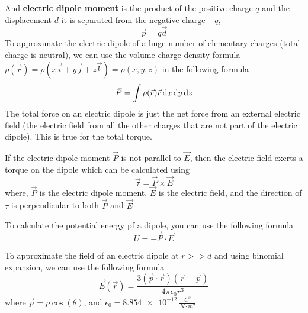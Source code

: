 And \textbf{electric dipole moment} is the product of the positive charge $q$ and the displacement $d$ it is separated from the negative charge $-q$,
\begin{equation}
\vec{p} = q\vec{d}
\end{equation}
To approximate the electric dipole of a huge number of elementary charges (total charge is neutral), we can use the volume charge density formula $\rho(\vec{r}) = \rho(x\vec{i} + y\vec{j} + z\vec{k}) = \rho(x, y, z) $ in the following formula
\begin{equation}
\vec{P} = \int\rho(\vec{r})\vec{r}\operatorname{d\!} x \operatorname{d\!} y \operatorname{d\!} z
\end{equation}
The total force on an electric dipole is just the net force from an external electric field (the electric field from all the other charges that are not part of the electric dipole). This is true for the total torque.

If the electric dipole moment $\vec{P}$ is not parallel to $\vec{E}$, then the electric field exerts a torque on the dipole which can be calculated using
\begin{equation}
\vec{\tau} = \vec{P} \times \vec{E}
\end{equation}
where, $\vec{P}$ is the electric dipole moment, $\vec{E}$ is the electric field, and the direction of $\tau$ is perpendicular to both $\vec{P}$ and $\vec{E}$

To calculate the potential energy pf a dipole, you can use the following formula
\begin{equation}
U = -\vec{P}\cdot \vec{E}
\end{equation}

To approximate the field of an electric dipole at $r>>d$ and using binomial expansion, we can use the following formula
\begin{equation}
\vec{E}(\vec{r}) = \frac{3(\vec{p}\cdot \vec{r})(\vec{r} - \vec{p})}{4 \pi \epsilon_0 r^3}
\end{equation}
where $\vec{p} = p\cos(\theta)$, and $\epsilon_0 = \SI{8.854e-12}{\frac{C^2}{N \cdot m^2}}$

